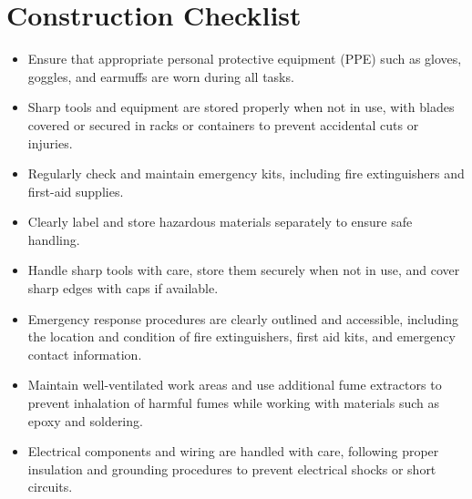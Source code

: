 \section{Construction Checklist} \label{app:construction_checklist}

\begin{itemize}[label=, leftmargin=0pt, itemindent=15pt]
    \setlength{\itemsep}{0pt}
    \item Ensure that appropriate personal protective equipment (PPE) such as gloves, goggles, and earmuffs are worn during all tasks.
    \item Sharp tools and equipment are stored properly when not in use, with blades covered or secured in racks or containers to prevent accidental cuts or injuries.
    \item Regularly check and maintain emergency kits, including fire extinguishers and first-aid supplies.
    \item Clearly label and store hazardous materials separately to ensure safe handling.
    \item Handle sharp tools with care, store them securely when not in use, and cover sharp edges with caps if available.
    \item Emergency response procedures are clearly outlined and accessible, including the location and condition of fire extinguishers, first aid kits, and emergency contact information.
    \item Maintain well-ventilated work areas and use additional fume extractors to prevent inhalation of harmful fumes while working with materials such as epoxy and soldering.
    \item Electrical components and wiring are handled with care, following proper insulation and grounding procedures to prevent electrical shocks or short circuits.
\end{itemize}